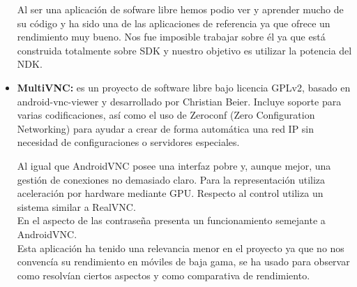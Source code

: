 \begin{itemize}
Al ser una aplicación de sofware libre hemos podio ver y aprender mucho de su código y ha sido una de las aplicaciones de referencia ya que ofrece un rendimiento muy bueno. Nos fue imposible trabajar sobre él ya que está construida totalmente sobre SDK y nuestro objetivo es utilizar la potencia del NDK.

\item \textbf{MultiVNC\cite{multivnc:multivnc}:} es un proyecto de software libre bajo licencia GPLv2,  basado en android-vnc-viewer y desarrollado por Christian Beier. Incluye soporte para varias codificaciones, así como el uso de Zeroconf (Zero Configuration Networking) para ayudar a crear de forma automática una red IP sin necesidad de configuraciones o servidores especiales.

Al igual que AndroidVNC posee una interfaz pobre y, aunque mejor, una gestión de conexiones no demasiado claro. Para la representación utiliza aceleración por hardware mediante GPU. Respecto al control utiliza un sistema similar a RealVNC.\\

En el aspecto de las contraseña presenta un funcionamiento semejante a AndroidVNC.\\

Esta aplicación ha tenido una relevancia menor en el proyecto ya que no nos convencía su rendimiento en móviles de baja gama, se ha usado para observar como resolvían ciertos aspectos y como comparativa de rendimiento.
 
\end{itemize}
